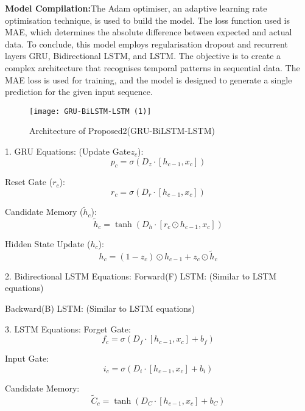 \textbf{Model Compilation:}The Adam optimiser, an adaptive learning rate optimisation technique, is used to build the model. The loss function used is MAE, which determines the absolute difference between expected and actual data. To conclude, this model employs regularisation dropout and recurrent layers GRU, Bidirectional LSTM, and LSTM. The objective is to create a complex architecture that recognises temporal patterns in sequential data. The MAE loss is used for training, and the model is designed to generate a single prediction for the given input sequence.



\begin{figure}[!ht]
\centering
\texttt{[image: GRU-BiLSTM-LSTM (1)]}
\caption{Architecture of Proposed2(GRU-BiLSTM-LSTM)}
\label{}
\end{figure}




1. GRU Equations:
(Update Gate$z_c$):
\begin{equation}
p_c = \sigma(D_z \cdot [h_{c-1}, x_c])
\end{equation}

Reset Gate ($r_c$):
\begin{equation}
r_c = \sigma(D_r \cdot [h_{c-1}, x_c])
\end{equation}

Candidate Memory ($\tilde{h}_c$):
\begin{equation}
\tilde{h}_c = \tanh(D_h \cdot [r_c \odot h_{c-1}, x_c])
\end{equation}

Hidden State Update ($h_c$):
\begin{equation}
h_c = (1 - z_c) \odot h_{c-1} + z_c \odot \tilde{h}_c
\end{equation}

2. Bidirectional LSTM Equations:
Forward(F) LSTM:
(Similar to LSTM equations)

Backward(B) LSTM:
(Similar to LSTM equations)

3. LSTM Equations:
Forget Gate:
\begin{equation}
f_c = \sigma(D_f \cdot [h_{c-1}, x_c] + b_f)
\end{equation}

Input Gate:
\begin{equation}
i_c = \sigma(D_i \cdot [h_{c-1}, x_c] + b_i)
\end{equation}

Candidate Memory:
\begin{equation}
\tilde{C}_c = \tanh(D_C \cdot [h_{c-1}, x_c] + b_C)
\end{equation}

